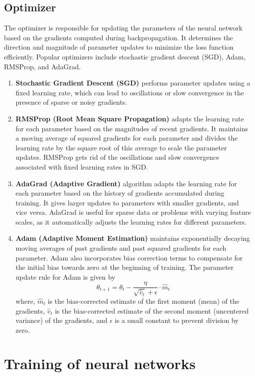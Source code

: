 \subsection{Optimizer}
The optimizer is responsible for updating the parameters of the neural network based on the gradients computed during backpropagation. It determines the direction and magnitude of parameter updates to minimize the loss function efficiently. Popular optimizers include stochastic gradient descent (SGD), Adam, RMSProp, and AdaGrad.
\begin{enumerate}
\item \textbf{Stochastic Gradient Descent (SGD)} performs parameter updates using a fixed learning rate, which can lead to oscillations or slow convergence in the presence of sparse or noisy gradients.
\item \textbf{RMSProp (Root Mean Square Propagation)} adapts the learning rate for each parameter based on the magnitudes of recent gradients. It maintains a moving average of squared gradients for each parameter and divides the learning rate by the square root of this average to scale the parameter updates. RMSProp gets rid of the oscillations and slow convergence associated with fixed learning rates in SGD.
\item \textbf{AdaGrad (Adaptive Gradient)} algorithm adapts the learning rate for each parameter based on the history of gradients accumulated during training. It gives larger updates to parameters with smaller gradients, and vice versa. AdaGrad is useful for sparse data or problems with varying feature scales, as it automatically adjusts the learning rates for different parameters.
\item \textbf{Adam (Adaptive Moment Estimation)} maintains exponentially decaying moving averages of past gradients and past squared gradients for each parameter. Adam also incorporates bias correction terms to compensate for the initial bias towards zero at the beginning of training. The parameter update rule for Adam is given by
\begin{equation}
    \theta_{t+1}=\theta_t-\frac{\eta}{\sqrt{\hat{v}_t}+\epsilon} \cdot \hat{m}_t
    \end{equation}
where, $\hat{m}_t$ is the bias-corrected estimate of the first moment (mean) of the gradients, $\hat{v}_t$ is the bias-corrected estimate of the second moment (uncentered variance) of the gradients, and $\epsilon$ is a small constant to prevent division by zero.
\end{enumerate}
\section{Training of neural networks}
